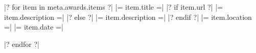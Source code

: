 



\begin{cvhonors}

|? for item in meta.awards.items ?|
  \cvhonor
    {|= item.title =|}
  |? if item.url ?|
    {
        {|= item.description =|}}
  |? else ?|
    {|= item.description =|}
  |? endif ?|
    {|= item.location =|}
    {|= item.date =|}

|? endfor ?|

\end{cvhonors}

